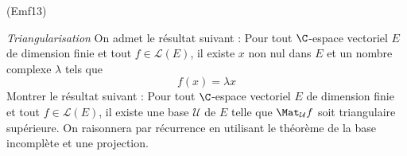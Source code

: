 \begin{tiny}(Emf13)\end{tiny}
\emph{Triangularisation}\newline
On admet le résultat suivant :\newline
Pour tout $\C$-espace vectoriel $E$ de dimension finie et tout $f\in \mathcal L(E)$, il existe $x$ non nul dans $E$ et un nombre complexe $\lambda$ tels que
\begin{displaymath}
 f(x)=\lambda x
\end{displaymath}
Montrer le résultat suivant :\newline
Pour tout $\C$-espace vectoriel $E$ de dimension finie et tout $f\in \mathcal L(E)$, il existe une base $\mathcal U$ de $E$ telle que $\Mat_{\mathcal U}f$ soit triangulaire supérieure. On raisonnera par récurrence en utilisant le théorème de la base incomplète et une projection.